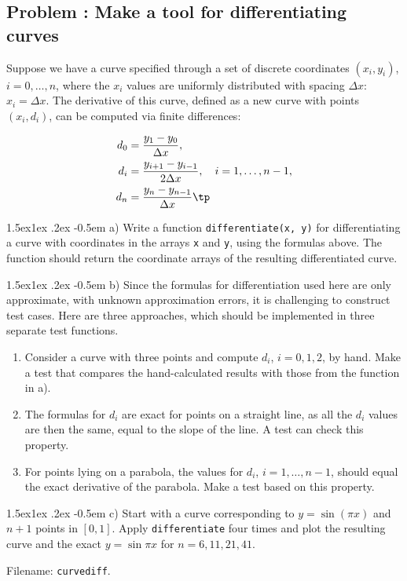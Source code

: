 \documentclass[%
oneside,                 %
final,                   %
10pt]{article}
\makeatletter
\newenvironment{doconceexercise}{}{}
\newcounter{doconceexercisecounter}
\newcommand\subex{\@startsection{paragraph}{4}{\z@}%
                  {1.5ex\@plus1ex \@minus.2ex}%
                  {-0.5em}%
                  {\normalfont\normalsize\bfseries}}
\makeatother
\begin{document}
\begin{doconceexercise}

\subsection*{Problem \thedoconceexercisecounter: Make a tool for differentiating curves}

\label{softeng1:exer:derivative}

Suppose we have a curve specified through a set
of discrete coordinates $(x_i,y_i)$, $i=0,\ldots,n$, where the $x_i$
values are uniformly distributed with spacing $\Delta x$: $x_i=\Delta x$.
The derivative of this curve, defined as a new curve with points
$(x_i, d_i)$, can be computed via finite differences:

\begin{align}
d_0 &= \frac{y_1-y_0}{\Delta x},\\ 
d_i &= \frac{y_{i+1}-y_{i-1}}{2\Delta x},\quad i=1,\ldots,n-1,\\ 
d_n &= \frac{y_n-y_{n-1}}{\Delta x}\tp
\end{align}


\subex{a)}
Write a function
\texttt{differentiate(x, y)} for differentiating a curve
with coordinates in the arrays \texttt{x} and \texttt{y}, using the
formulas above. The function should return the coordinate arrays
of the resulting differentiated curve.

\subex{b)}
Since the formulas for differentiation used here are only approximate,
with unknown approximation errors, it is challenging to construct
test cases. Here are three approaches, which should be implemented
in three separate test functions.

\begin{enumerate}
\item Consider a curve with three points and compute $d_i$, $i=0,1,2$,
   by hand. Make a test that compares the hand-calculated results with those
   from the function in a).

\item The formulas for $d_i$ are exact for points on
   a straight line, as all the $d_i$ values are then the same, equal to
   the slope of the line. A test can check this property.

\item For points lying on a parabola, the values for $d_i$, $i=1,\ldots,n-1$,
   should equal the exact derivative of the parabola. Make a test based on
   this property.
\end{enumerate}

\noindent
\subex{c)}
Start with a curve corresponding to $y=\sin(\pi x)$ and $n+1$
points in $[0,1]$. Apply \texttt{differentiate} four times and plot the
resulting curve and the exact $y=\sin\pi x$ for $n=6, 11, 21, 41$.



\noindent Filename: \texttt{curvediff}.

\end{doconceexercise}
\end{document}
